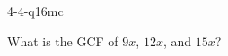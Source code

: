 \documentclass[12pt, fleqn, openany]{studyGuide}
\begin{document}
\begin{practiceQuestion}{4-4-q16}{mc}
\begin{questionText}
What is the GCF of $9x$, $12x$, and $15x$?
\end{questionText}
\end{practiceQuestion}



\printAnswerKey


\end{document}
